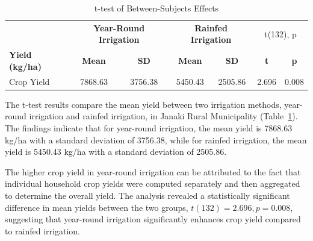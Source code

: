 \begin{table}[htbp]
    \centering
    \caption{t-test of Between-Subjects Effects}
    \label{tab:t_test_irrigation}
    \begin{tabular}{@{}l c c c c c c@{}}
        \toprule
        & \multicolumn{2}{c}{\textbf{Year-Round Irrigation}} & \multicolumn{2}{c}{\textbf{Rainfed Irrigation}} & \multicolumn{2}{c}{t(132), p} \\
        \cmidrule(lr){2-3} \cmidrule(lr){4-5}
        \textbf{Yield (kg/ha)} & \textbf{Mean} & \textbf{SD} & \textbf{Mean} & \textbf{SD} & \textbf{t} & \textbf{p} \\
        \midrule
        Crop Yield & 7868.63 & 3756.38 & 5450.43 & 2505.86 & 2.696 & 0.008 \\
        \bottomrule
    \end{tabular}
\end{table}

The t-test results compare the mean yield between two irrigation methods, year-round irrigation and rainfed irrigation, in Janaki Rural Municipality (Table~\ref{tab:t_test_irrigation}). The findings indicate that for year-round irrigation, the mean yield is 7868.63 kg/ha with a standard deviation of 3756.38, while for rainfed irrigation, the mean yield is 5450.43 kg/ha with a standard deviation of 2505.86. 

The higher crop yield in year-round irrigation can be attributed to the fact that individual household crop yields were computed separately and then aggregated to determine the overall yield. The analysis revealed a statistically significant difference in mean yields between the two groups, \( t(132) = 2.696, p = 0.008 \), suggesting that year-round irrigation significantly enhances crop yield compared to rainfed irrigation.


